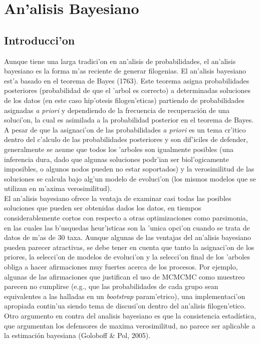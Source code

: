 \chapter{An'alisis Bayesiano}
\section*{Introducci'on}
Aunque tiene una larga tradici'on en an'alisis de probabilidades, el an'alisis bayesiano es la forma m'as reciente de generar filogenias.  El an'alisis bayesiano est'a basado en el teorema de Bayes (1763). Este teorema asigna probabilidades posteriores (probabilidad de que el 'arbol es correcto) a determinadas soluciones de los datos (en este caso hip'otesis filogen'eticas) partiendo de probabilidades asignadas \textit{a priori} y dependiendo de la frecuencia de recuperaci\'on de una soluci'on, la cual es asimilada a la probabilidad posterior en el teorema de Bayes.\\
A pesar de que la asignaci'on de las probabilidades  \textit{a priori} es un tema cr'itico dentro del c'alculo de las probabilidades posteriores y son dif'iciles de defender, generalmente se asume
que todos los 'arboles son igualmente posibles (una inferencia dura, dado que algunas soluciones 
podr'ian ser biol'ogicamente imposibles, o algunos nodos pueden no estar soportados) y la verosimilitud de las soluciones se calcula bajo alg'un modelo de evoluci'on (los mismos modelos que se utilizan en m'axima verosimilitud).\\
El an'alisis bayesiano ofrece la ventaja de examinar casi todas las posibles soluciones que pueden ser obtenidas dados los datos, en tiempos considerablemente cortos con respecto a otras optimizaciones como parsimonia, en las cuales las b'usquedas heur'isticas son la 'unica opci'on cuando se trata de datos de m'as de 30 taxa. Aunque algunas de las ventajas del an'alisis bayesiano pueden parecer atractivas, se debe tener en cuenta que tanto la asignaci'on de los priores, la selecci'on de modelos de evoluci'on y la selecci'on final de los 'arboles obliga a hacer afirmaciones muy fuertes acerca de los procesos. Por ejemplo, algunas de las afirmaciones que justifican el uso de MCMCMC como muestreo parecen no cumplirse (e.g., que las probabilidades de cada grupo sean equivalentes a las halladas en un \textit{bootstrap} param'etrico), una implementaci'on apropiada contin'ua siendo tema de discusi'on dentro del an'alisis filogen'etico. Otro argumento en contra del analisis bayesiano es que la consistencia estad\'istica, que argumentan los defensores de maxima verosimilitud, no parece ser aplicable a la estimaci\'on bayesiana (Goloboff \& Pol, 2005).
\\
